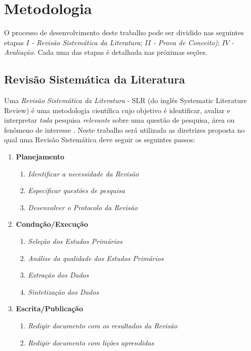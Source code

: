 \documentclass[msc,proposal,hidelot,hideabstract]{ppgccufmg} %
\begin{document}
\chapter{Metodologia}
\label{ch:metodologia}

O processo de desenvolvimento deste trabalho pode ser dividido nas seguintes
etapas $I$\textit{ - Revisão Sistemática da Literatura}; $II$\textit{ - Prova de Conceito)}; $IV$\textit{ - Avaliação}. Cada uma das etapas é detalhada nas próximas seções.

\section{Revisão Sistemática da Literatura}
\label{sec:revisao_sistematica}

Uma \textit{Revisão Sistemática da Literatura} - SLR (do inglês Systematic Literature Review) é uma
metodologia científica cujo objetivo é identificar, avaliar e interpretar
\textit{toda} pesquisa \textit{relevante} sobre uma questão de pesquisa, área
ou fenômeno de interesse \cite{keele2007guidelines,wohlin2012experimentation}. Neste trabalho
será utilizada as diretrizes proposta \cite{keele2007guidelines} no qual uma
Revisão Sistemática deve seguir os seguintes passos:

\begin{enumerate}
  \item \textbf{Planejamento}
  \begin{enumerate}
    \item \textit{Identificar a necessidade da Revisão}
    \item \textit{Especificar questões de pesquisa}
    \item \textit{Desenvolver o Protocolo da Revisão}
  \end{enumerate}
  \item \textbf{Condução/Execução}
  \begin{enumerate}
    \item \textit{Seleção dos Estudos Primários}
    \item \textit{Análise da qualidade dos Estudos Primários}
     \item \textit{Extração dos Dados}
     \item \textit{Sintetização dos Dados}
   \end{enumerate}
  \item \textbf{Escrita/Publicação}
  \begin{enumerate}
    \item \textit{Redigir documento com os resultados da Revisão}
    \item \textit{Redigir documento com lições aprendidas}
  \end{enumerate}
\end{enumerate}
\end{document}

